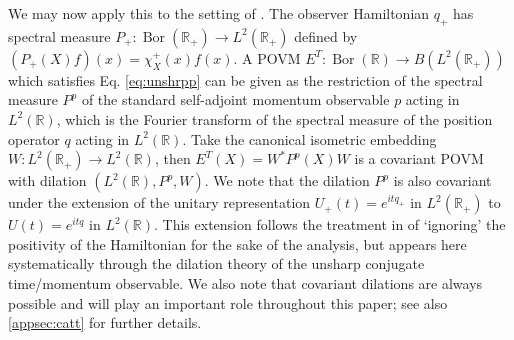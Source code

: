 \documentclass[sn-mathphys-num]{sn-jnl}%
\DeclareMathOperator{\Bor}{Bor}
\numberwithin{equation}{section}
\theoremstyle{thmstyleone}%
\theoremstyle{thmstyletwo}%
\theoremstyle{thmstylethree}%
\begin{document}
We may now apply this to the setting of \cite{chandrasekaran2023algebra}. 
The observer Hamiltonian $q_+$ has spectral measure $P_+:\Bor(\mathbb{R}_+) \to L^2(\mathbb{R}_+)$ defined by $(P_+(X)f)(x)=\chi^+_{X}(x)f(x)$. A POVM $E^T:\Bor(\mathbb{R})\to B(L^2(\mathbb{R}_+))$ which satisfies Eq. \eqref{eq:unshrpp} can be 
 given as the restriction of the spectral measure $P^p$ of the
standard self-adjoint momentum observable $p$ acting in $L^2(\mathbb{R})$, which is the Fourier transform of the spectral measure of the position operator $q$ acting in $L^2(\mathbb{R})$.  Take the canonical isometric embedding $W:L^2(\mathbb{R}_+) \to L^2(\mathbb{R})$, then $E^T(X)=W^*P^p(X)W$ is a covariant POVM with dilation $(L^2(\mathbb{R}),P^p,W)$. We note that the dilation $P^p$ is also covariant under the extension of the unitary representation $U_+(t)= e^{itq_+}$ in $L^2(\mathbb{R}_+)$ to $U(t)=e^{itq}$ in $L^2(\mathbb{R})$. This extension follows the treatment in \cite{chandrasekaran2023algebra} of `ignoring' the positivity of the Hamiltonian for the sake of the analysis, but appears here systematically through the dilation theory of the unsharp conjugate time/momentum observable. We also note that covariant dilations are always possible and will play an important role throughout this paper; see also \ref{appsec:catt} for further details.
\end{document}
